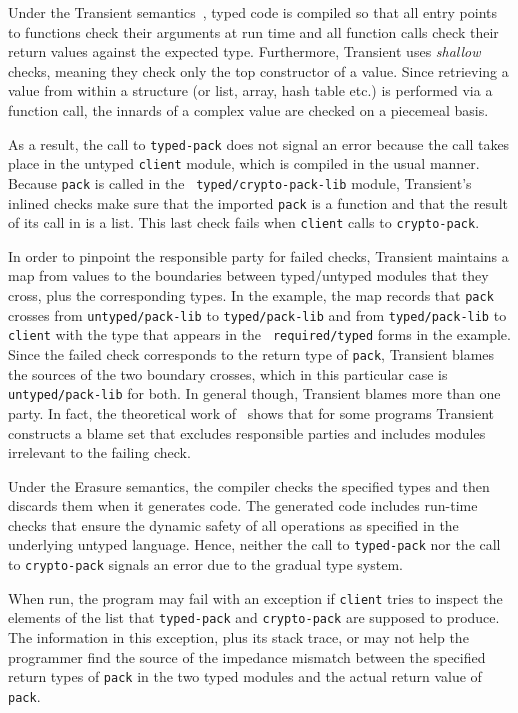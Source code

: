 Under the Transient semantics~\cite{vss-popl-2017}, typed code is compiled so
that all entry points to functions check their arguments at run time and all
function calls check their return values against the expected type.
Furthermore, Transient uses \emph{shallow} checks, meaning they check only the
top constructor of a value. Since retrieving a value from within a structure (or
list, array, hash table etc.) is performed via a function call, the innards of a
complex value are checked on a piecemeal basis.

As a result, the call to \texttt{typed-pack} does not signal an error because
the call takes place in the untyped {\tt client} module, which is compiled in
the usual manner. Because {\tt pack} is called in the {\tt
typed/crypto-pack-lib} module, Transient's inlined checks make sure that the
imported \texttt{pack} is a function and that the result of its call in is a
list. This last check fails when \texttt{client} calls to {\tt crypto-pack}.

In order to pinpoint the responsible party for failed checks, Transient
maintains a map from values to the boundaries between typed/untyped modules that
they cross, plus the corresponding types. In the example, the map records that
\texttt{pack} crosses from \texttt{untyped/pack-lib} to {\tt typed/pack-lib} and
from {\tt typed/pack-lib} to {\tt client} with the type that appears in the {\tt
required/typed} forms in the example. Since the failed check corresponds to the
return type of \texttt{pack}, Transient blames the sources of the two boundary
crosses, which in this particular case is \texttt{untyped/pack-lib} for both. In
general though, Transient blames more than one party. In fact, the theoretical
work of~\citet{gfd-oopsla-2019} shows that for some programs Transient
constructs a blame set that excludes responsible parties and includes modules
irrelevant to the failing check.

Under the Erasure semantics, the compiler checks the specified types and then
discards them when it generates code. The generated code includes run-time
checks that ensure the dynamic safety of all operations as specified in the
underlying untyped language. Hence, neither the call to {\tt typed-pack} nor the
call to {\tt crypto-pack} signals an error due to the gradual type system.

When run, the program may fail with an exception if \texttt{client} tries to
inspect the elements of the list that \texttt{typed-pack} and
\texttt{crypto-pack} are supposed to produce. The information in this exception,
plus its stack trace, or may not help the programmer find the source of the
impedance mismatch between the specified return types of {\tt pack} in the two
typed modules and the actual return value of {\tt pack}.


